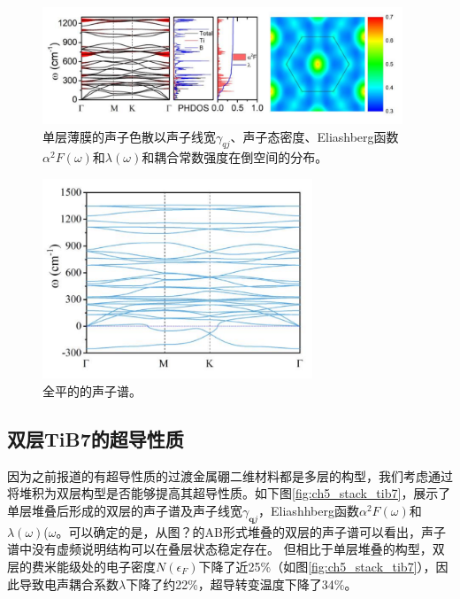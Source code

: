 \begin{figure}
  \includegraphics[width=0.96\textwidth]{figs/ch5_tib9_phonon.png}
  \centering
  \caption{单层薄膜的声子色散以声子线宽$\gamma_{qj}$、声子态密度、Eliashberg函数$\alpha^2 F(\omega)$和$\lambda(\omega)$和耦合常数强度在倒空间的分布。}
  \label{fig:ch5_tib9_phonon}
\end{figure}

\begin{figure}
  \includegraphics[width=0.72\textwidth]{figs/ch5_tib9_phonon_a.png}
  \centering
  \caption{全平的的声子谱。}
  \label{fig:ch5_tib9_phonon_a}
\end{figure}

\subsection{双层TiB7的超导性质}
因为之前报道的有超导性质的过渡金属硼二维材料都是多层的构型，我们考虑通过将堆积为双层构型是否能够提高其超导性质。如下图\ref{fig:ch5_stack_tib7}，展示了单层堆叠后形成的双层的声子谱及声子线宽$\gamma_{\bm{q}j}$，Eliashhberg函数$\alpha^2 F(\omega)$和$\lambda(\omega)$($\omega$。可以确定的是，从图？的AB形式堆叠的双层的声子谱可以看出，声子谱中没有虚频说明结构可以在叠层状态稳定存在。
但相比于单层堆叠的构型，双层的费米能级处的电子密度$N(\epsilon_F)$下降了近25\%（如图\ref{fig:ch5_stack_tib7}），因此导致电声耦合系数$\lambda$下降了约22\%，超导转变温度下降了34\%。

